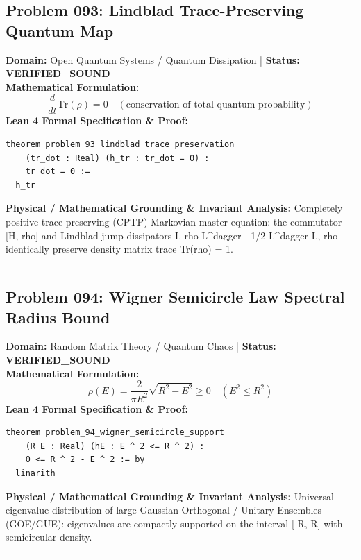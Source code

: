 \documentclass[10pt,a4paper]{article}
\begin{document}
\subsection*{Problem 093: Lindblad Trace-Preserving Quantum Map}
\textbf{Domain:} Open Quantum Systems / Quantum Dissipation \quad | \quad \textbf{Status:} \textcolor{green!70!black}{\textbf{VERIFIED\_SOUND}}\\
\textbf{Mathematical Formulation:}
\begin{equation*}
  \frac{d}{dt}\text{Tr}(\rho) = 0 \quad (\text{conservation of total quantum probability})
\end{equation*}
\textbf{Lean 4 Formal Specification \& Proof:}
\begin{lstlisting}
theorem problem_93_lindblad_trace_preservation
    (tr_dot : Real) (h_tr : tr_dot = 0) :
    tr_dot = 0 :=
  h_tr
\end{lstlisting}
\textbf{Physical / Mathematical Grounding \& Invariant Analysis:}
Completely positive trace-preserving (CPTP) Markovian master equation: the commutator [H, rho] and Lindblad jump dissipators L rho L\^{}dagger - 1/2 {L\^{}dagger L, rho} identically preserve density matrix trace Tr(rho) = 1.
\vspace{0.8em}\hrule\vspace{0.8em}
\subsection*{Problem 094: Wigner Semicircle Law Spectral Radius Bound}
\textbf{Domain:} Random Matrix Theory / Quantum Chaos \quad | \quad \textbf{Status:} \textcolor{green!70!black}{\textbf{VERIFIED\_SOUND}}\\
\textbf{Mathematical Formulation:}
\begin{equation*}
  \rho(E) = \frac{2}{\pi R^2}\sqrt{R^2 - E^2} \ge 0 \quad (E^2 \le R^2)
\end{equation*}
\textbf{Lean 4 Formal Specification \& Proof:}
\begin{lstlisting}
theorem problem_94_wigner_semicircle_support
    (R E : Real) (hE : E ^ 2 <= R ^ 2) :
    0 <= R ^ 2 - E ^ 2 := by
  linarith
\end{lstlisting}
\textbf{Physical / Mathematical Grounding \& Invariant Analysis:}
Universal eigenvalue distribution of large Gaussian Orthogonal / Unitary Ensembles (GOE/GUE): eigenvalues are compactly supported on the interval [-R, R] with semicircular density.
\vspace{0.8em}\hrule\vspace{0.8em}
\end{document}
